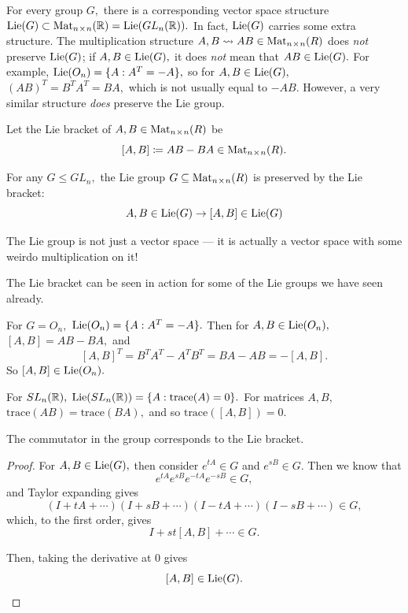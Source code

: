 For every group $G,$ there is a corresponding vector space structure $\operatorname{Lie}(G) \subset \text{Mat}_{n \hspace{0.05em}{\times}\hspace{0.05em} n}(\mathbb R) = \operatorname{Lie}(GL_n(\mathbb R)).$ In fact, $\operatorname{Lie}(G)$ carries some extra structure. The multiplication structure $A, B \rightsquigarrow AB \in \text{Mat}_{n \hspace{0.05em}{\times}\hspace{0.05em} n}(R)$ does \emph{not} preserve $\operatorname{Lie}(G)$; if $A, B \in \operatorname{Lie}(G),$ it does \emph{not} mean that $AB \in \operatorname{Lie}(G).$ For example, $\operatorname{Lie}(O_n) = \{A: A^T = -A\},$ so for $A, B \in \operatorname{Lie}(G),$ $(AB)^T = B^TA^T = BA,$ which is not usually equal to $-AB.$ However, a very similar structure \emph{does} preserve the Lie group.

\begin{definition}
Let the Lie bracket of $A, B \in \text{Mat}_{n \hspace{0.05em}{\times}\hspace{0.05em} n}(R)$ be \[[A, B] \coloneqq AB - BA \in \text{Mat}_{n \hspace{0.05em}{\times}\hspace{0.05em} n}(R).\]
\end{definition}


\begin{theorem}
For any $G \leq GL_n,$ the Lie group $G \subseteq \text{Mat}_{n \hspace{0.05em}{\times}\hspace{0.05em} n}(R)$ is preserved by the Lie bracket:
\[
A, B \in \lie(G) \rightarrow [A, B] \in \lie(G) %
\]
\end{theorem}

The Lie group is not just a vector space --- it is actually a vector space with some weirdo multiplication on it!

The Lie bracket can be seen in action for some of the Lie groups we have seen already.
\begin{example}
For $G = O_n,$ $\operatorname{Lie}(O_n) = \{A: A^T = -A\}.$ Then for $A, B \in \operatorname{Lie}(O_n),$ $[A, B] = AB - BA,$ and
\[
[A, B]^T = B^TA^T -A^TB^T = BA -AB = -[A, B].
\]
So $[A, B] \in \operatorname{Lie}(O_n).$
\end{example}
\begin{example}
For $SL_n(\mathbb R),$ $\operatorname{Lie}(SL_n(\mathbb R)) = \{A: \text{trace}(A) = 0\}.$ For matrices $A, B,$ $\text{trace}(AB) = \text{trace}(BA),$ and so $\text{trace}([A, B]) = 0.$ %
\end{example}

The commutator in the group corresponds to the Lie bracket. %
\begin{proof}
For $A, B \in \operatorname{Lie}(G),$ then consider $e^{tA} \in G$ and $e^{sB} \in G.$ Then we know that 
\[
e^{tA} e^{sB} e^{-tA}e^{-sB} \in G,
\]
and Taylor expanding gives
\[
(I + tA + \cdots)(I + sB + \cdots)(I -tA + \cdots)(I - sB + \cdots) \in G,
\]
which, to the first order, gives 
\[
I + st[A, B] + \cdots \in G.
\]

Then, taking the derivative at $0$ gives 
\[
[A, B] \in \operatorname{Lie}(G).
\]%
\end{proof}

